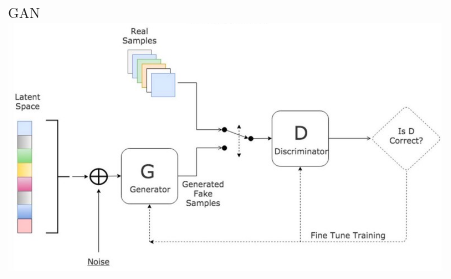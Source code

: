 \documentclass[10pt]{beamer}
\begin{document}
\begin{frame}
\begin{columns}[T]
\begin{column}[T]{0.33\textwidth}
\begin{center}
        \end{center}
    \end{column}
    \vline
    \begin{column}[T]{0.33\textwidth}
        \begin{center}
            GAN \\
            \includegraphics[width=0.9\textwidth]{images/gan.png}
        \end{center}
    \end{column}
\end{columns}

\end{frame}
\end{document}

